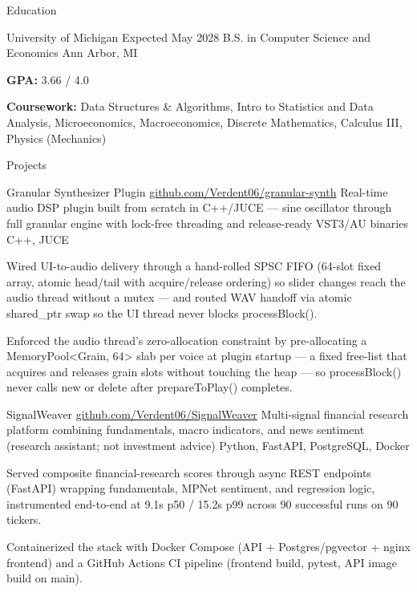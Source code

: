 \documentclass[
	11pt
]{../../../template}
\begin{document}
	\begin{rSection}{E}{ducation}
		\begin{rSectionEntry}
			{University of Michigan}
			{Expected May 2028}
			{B.S. in Computer Science and Economics}
			{}
			{Ann Arbor, MI}

			\item \textbf{GPA:} 3.66 / 4.0
			\item \textbf{Coursework:} Data Structures \& Algorithms, Intro to Statistics and Data Analysis, Microeconomics, Macroeconomics, Discrete Mathematics, Calculus III, Physics (Mechanics)
		\end{rSectionEntry}
	\end{rSection}

	\begin{rSection}{P}{rojects}
		\begin{rSectionEntry}
			{Granular Synthesizer Plugin}
			{\href{https://github.com/Verdent06/granular-synth}{github.com/Verdent06/granular-synth}}
			{Real-time audio DSP plugin built from scratch in C++/JUCE --- sine oscillator through full granular engine with lock-free threading and release-ready VST3/AU binaries}
			{C++, JUCE}
			{}

			\item Wired UI-to-audio delivery through a hand-rolled SPSC FIFO (64-slot fixed array, atomic head/tail with acquire/release ordering) so slider changes reach the audio thread without a mutex --- and routed WAV handoff via atomic shared\_ptr swap so the UI thread never blocks processBlock().
			\item Enforced the audio thread's zero-allocation constraint by pre-allocating a MemoryPool\textless{}Grain, 64\textgreater{} slab per voice at plugin startup --- a fixed free-list that acquires and releases grain slots without touching the heap --- so processBlock() never calls new or delete after prepareToPlay() completes.
		\end{rSectionEntry}

		\begin{rSectionEntry}
			{SignalWeaver}
			{\href{https://github.com/Verdent06/SignalWeaver}{github.com/Verdent06/SignalWeaver}}
			{Multi-signal financial research platform combining fundamentals, macro indicators, and news sentiment (research assistant; not investment advice)}
			{Python, FastAPI, PostgreSQL, Docker}
			{}

			\item Served composite financial-research scores through async REST endpoints (FastAPI) wrapping fundamentals, MPNet sentiment, and regression logic, instrumented end-to-end at 9.1s p50 / 15.2s p99 across 90 successful runs on 90 tickers.
			\item Containerized the stack with Docker Compose (API + Postgres/pgvector + nginx frontend) and a GitHub Actions CI pipeline (frontend build, pytest, API image build on main).
		\end{rSectionEntry}
	\end{rSection}
\end{document}
